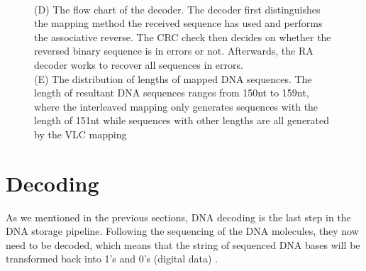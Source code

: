 \documentclass[10pt,twocolumn,twoside]{gsajnl}
\begin{document}
\begin{figure}[h!]
{\\(D) The flow chart of the decoder. The decoder first distinguishes the mapping method the received sequence has used and performs the associative reverse. The CRC check then decides on whether the reversed binary sequence is in errors or not. Afterwards, the RA decoder works to recover all sequences in errors.
\\(E) The distribution of lengths of mapped DNA sequences. The length of resultant DNA sequences ranges from 150nt to 159nt, where the interleaved mapping only generates sequences with the length of 151nt while sequences with other lengths are all generated by the VLC mapping}
\label{fig:my_label8}
\end{figure}
\section{Decoding}
As we mentioned in the previous sections, DNA decoding is the last step in the DNA storage pipeline. Following the sequencing of the DNA molecules, they now need to be decoded, which means that the string of sequenced DNA bases will be transformed back into 1's and 0's (digital data) \cite{alliance2021preserving}.
\end{document}
